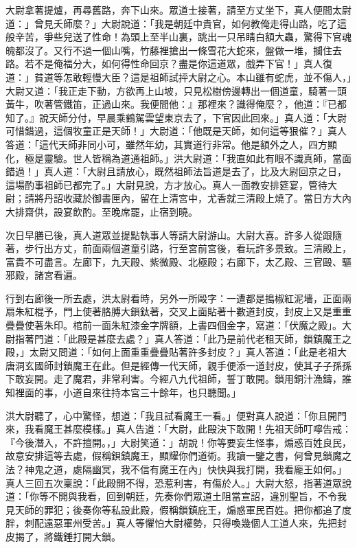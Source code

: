 \documentclass[11pt,a4paper]{article}
\begin{document}
大尉拿著提爐，再尋舊路，奔下山來。眾道士接著，請至方丈坐下，真人便間太尉道：」曾見夭師麼？」大尉說道：「我是朝廷中貴官，如何教俺走得山路，吃了這般辛苦，爭些兒送了性命！為頭上至半山裏，跳出一只吊睛白額大蟲，驚得下官魂魄都沒了。又行不過一個山嘴，竹藤裡搶出一條雪花大蛇來，盤做一堆，攔住去路。若不是俺福分大，如何得性命回京？盡是你這道眾，戲弄下官！」真人復道：」貧道等怎敢輕慢大臣？這是祖師試抨大尉之心。本山雖有蛇虎，並不傷人，」大尉又道：「我正走下動，方欲再上山坡，只見松樹傍邊轉出一個道童，騎著一頭黃牛，吹著管鐵笛，正過山來。我便間他：』那裡來？識得俺麼？，他道：『已都知了。』說天師分付，早晨乘鶴駕雲望東京去了，下官因此回來。」真人道：「大尉可惜錯過，這個牧童正是天師！」大尉道：「他既是天師，如何這等狠催？」真人答道：「這代天師非同小可，雖然年幼，其實道行非常。他是額外之人，四方顯化，極是靈驗。世人皆稱為道通祖師。」洪大尉道：「我直如此有眼不識真師，當面錯過！」真人道：「大尉且請放心，既然祖師法旨道是去了，比及大尉回京之日，這場酌事祖師已都完了。」大尉見說，方才放心。真人一面教安排筵宴，管待大尉；請將丹詔收藏於御書匣內，留在上清宮中，尤香就三清殿上燒了。當日方大內大排齋供，設宴飲酌。至晚席罷，止宿到曉。

次日早膳已後，真人道眾並提點執事人等請大尉游山。大尉大喜。許多人從跟隨著，步行出方丈，前面兩個道童引路，行至宮前宮後，看玩許多景致。三清殿上，富貴不可盡言。左廊下，九天殿、紫微殿、北極殿；右廊下，太乙殿、三官毆、驅邪殿，諸宮看遍。

行到右廊後一所去處，洪太尉看時，另外一所毆字：一遭都是搗椒紅泥墻，正面兩扇朱紅棍予，門上使著胳膊大鎖鈦著，交叉上面貼著十數道封皮，封皮上又是重重疊疊使著朱印。棺前一面朱紅漆金字牌額，上書四個金字，寫道：「伏魔之殿」。大尉指著門道：「此殿是甚麼去處？」真人答道：「此乃是前代老租天師，鎖鎮魔王之殿，」太尉又問道：「如何上面重重疊疊貼著許多封皮？」真人答道：「此是老祖大唐洞玄國師封鎖魔王在此。但是經傳一代天師，親手便添一道封皮，使其子子孫孫下敢妄開。走了魔君，非常利害。今經八九代祖師，誓丁敢開。鎖用銅汁漁鑄，誰知裡面的事，小道自來往持本宮三十餘年，也只聽聞。」

洪大尉聽了，心中驚怪，想道：「我且試看魔王一看。」便對真人說道：「你且開門來，我看魔王甚麼模樣。」真人告道：「大尉，此毆決下敢開！先祖天師叮嚀告戒：『今後潛入，不許擅開。，」大尉笑道：」胡說！你等要妄生怪事，煽惑百姓良民，故意安排這等去處，假稱鋇鎮魔王，顯耀你們道術。我讀一鑒之書，何曾見鎖魔之法？神鬼之道，處隔幽冥，我不信有魔王在內」快快與我打開，我看龐王如何。」真人三回五次稟說：「此殿開不得，恐惹利害，有傷於人。」大尉大怒，指著道眾說道：「你等不開與我看，回到朝廷，先奏你們眾道土阻當宣詔，違別聖旨，不令我見天師的罪犯；後奏你等私設此殿，假稱鎖鎮庇王，煽惑軍民百姓。把你都追了度胖，刺配遠惡軍州受苦。」真人等懼怕大尉權勢，只得喚幾個人工道人來，先把封皮揭了，將鐵錘打開大鎖。
\end{document}
